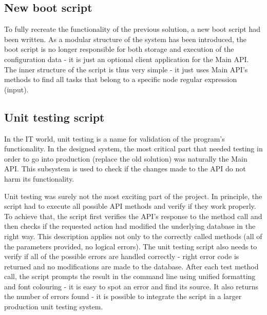 \documentclass{customization}
\begin{document}

\subsection{New boot script}
\hspace{0.6cm}

To fully recreate the functionality of the previous solution, a new boot script had been written. As a modular structure of the system has been introduced, the boot script is no longer responsible for both storage and execution of the configuration data - it is just an optional client application for the Main API. The inner structure of the script is thus very simple - it just uses Main API's methods to find all tasks that belong to a specific node regular expression (input).


\subsection{Unit testing script}
\hspace{0.6cm}

In the IT world, unit testing is a name for validation of the program's functionality. In the designed system, the most critical part that needed testing in order to go into production (replace the old solution) was naturally the Main API. This subsystem is used to check if the changes made to the API do not harm its functionality.
\newline

\noindent
Unit testing was surely not the most exciting part of the project. In principle, the script had to execute all possible API methods and verify if they work properly. To achieve that, the script first verifies the API's response to the method call and then checks if the requested action had modified the underlying database in the right way.
\newline  \newline
This description applies not only to the correctly called methods (all of the parameters provided, no logical errors). The unit testing script also needs to verify if all of the possible errors are handled correctly - right error code is returned and no modifications are made to the database.
\newline  \newline
After each test method call, the script prompts the result in the command line using unified formatting and font colouring - it is easy to spot an error and find its source. It also returns the number of errors found - it is possible to integrate the script in a larger production unit testing system.
\end{document}
